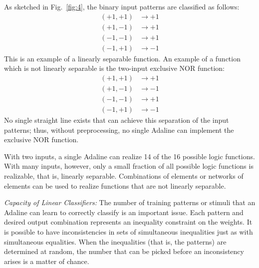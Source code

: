 \documentclass[10pt,twocolumn]{article}
\begin{document}
As sketched in Fig.~\ref{fig:4}, the binary input patterns are classified as
follows:
\begin{equation}
\begin{aligned}
(+1,+1) &\to +1\\
(+1,-1) &\to +1\\
(-1,-1) &\to +1\\
(-1,+1) &\to -1
\end{aligned}\tag{4}
\end{equation}
This is an example of a linearly separable function. An example of a function
which is not linearly separable is the two-input exclusive NOR function:
\begin{equation}
\begin{aligned}
(+1,+1) &\to +1\\
(+1,-1) &\to -1\\
(-1,-1) &\to +1\\
(-1,+1) &\to -1
\end{aligned}\tag{5}
\end{equation}
No single straight line exists that can achieve this separation of the input
patterns; thus, without preprocessing, no single Adaline can implement the
exclusive NOR function.

With two inputs, a single Adaline can realize 14 of the 16 possible logic
functions. With many inputs, however, only a small fraction of all possible
logic functions is realizable, that is, linearly separable. Combinations of
elements or networks of elements can be used to realize functions that are not
linearly separable.

\textit{Capacity of Linear Classifiers:} The number of training patterns or
stimuli that an Adaline can learn to correctly classify is an important issue.
Each pattern and desired output combination represents an inequality constraint
on the weights. It is possible to have inconsistencies in sets of simultaneous
inequalities just as with simultaneous equalities. When the inequalities (that
is, the patterns) are determined at random, the number that can be picked before
an inconsistency arises is a matter of chance.
\end{document}
